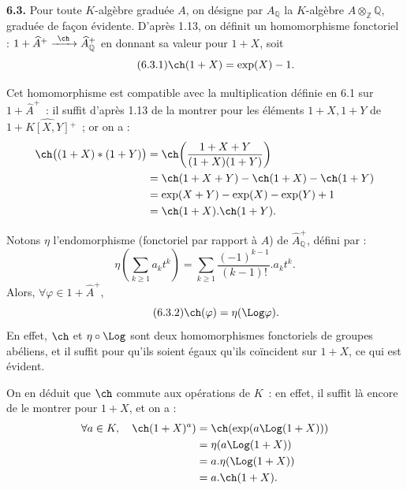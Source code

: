 \textbf{6.3.}
Pour toute \(K\)-algèbre graduée \(A\), on désigne par \(A_{\mathbb Q}\) la \(K\)-algèbre \(A\otimes_{\mathbb Z}\mathbb Q\), graduée de façon évidente. D'après 1.13, on définit un homomorphisme fonctoriel : \(1+\widehat A^+\xrightarrow{\ \ch\ }\widehat A_{\mathbb Q}^{+}\) en donnant sa valeur pour \(1+X\), soit
\begin{equation}\tag{6.3.1}
  \ch(1+X)=\exp(X)-1.
\end{equation}

Cet homomorphisme est compatible avec la multiplication définie en 6.1 sur \(1+\widehat A^+\)~: il suffit d'après 1.13 de la montrer pour les éléments \(1+X,1+Y\) de \(1+\widehat{K[X,Y]}{}^{+}\)~; or on a :
\[
\begin{aligned}
 \ch\bigl((1+X)*(1+Y)\bigr)
 &= \ch\!\left(\frac{1+X+Y}{(1+X)(1+Y)}\right)\\
 &= \ch(1+X+Y)-\ch(1+X)-\ch(1+Y)\\
 &= \exp(X+Y)-\exp(X)-\exp(Y)+1\\
 &= \ch(1+X).\ch(1+Y).
\end{aligned}
\]

Notons \(\eta\) l'endomorphisme (fonctoriel par rapport à \(A\)) de \(\widehat A_{\mathbb Q}^{+}\), défini par :
\[
 \eta\!\left(\sum_{k\ge1} a_k t^k\right)
 =
 \sum_{k\ge1}\frac{(-1)^{k-1}}{(k-1)!}.a_k t^k.
\]
Alors, \(\forall\varphi\in1+\widehat A^+\),
\begin{equation}\tag{6.3.2}
  \ch(\varphi)=\eta(\Log\varphi).
\end{equation}
En effet, \(\ch\) et \(\eta\circ\Log\) sont deux homomorphismes fonctoriels de groupes abéliens, et il suffit pour qu'ils soient égaux qu'ils coïncident sur \(1+X\), ce qui est évident.

On en déduit que \(\ch\) commute aux opérations de \(K\)~: en effet, il suffit là encore de le montrer pour \(1+X\), et on a :
\[
\begin{aligned}
 \forall a\in K,\quad\ch(1+X)^a)
 &=\ch(\exp(a\Log(1+X)))\\
 &=\eta(a\Log(1+X))\\
 &=a.\eta(\Log(1+X))\\
 &=a.\ch(1+X).
\end{aligned}
\]
